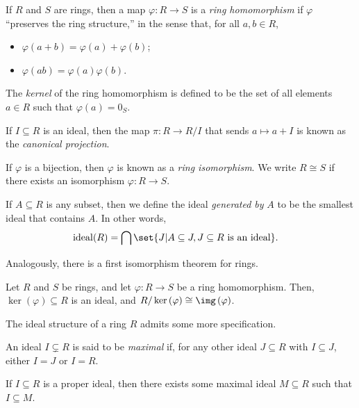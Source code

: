 \begin{definition}
  If $R$ and $S$ are rings, then a map $\varphi\colon R\rightarrow S$ is a \textit{ring homomorphism} if $\varphi$ ``preserves the ring structure,'' in the sense that, for all $a,b\in R$,
  \begin{itemize}
    \item $\varphi\left(a+b\right) = \varphi\left(a\right) + \varphi\left(b\right)$;
    \item $\varphi\left(ab\right) = \varphi\left(a\right)\varphi\left(b\right)$.
  \end{itemize}
  The \textit{kernel} of the ring homomorphism is defined to be the set of all elements $a\in R$ such that $\varphi\left(a\right) = 0_{S}$.\newline

  If $I \subseteq R$ is an ideal, then the map $\pi\colon R\rightarrow R/I$ that sends $a \mapsto a + I$ is known as the \textit{canonical projection}.\newline

  If $\varphi$ is a bijection, then $\varphi$ is known as a \textit{ring isomorphism}. We write $R\cong S$ if there exists an isomorphism $\varphi\colon R\rightarrow S$.

  If $A\subseteq R$ is any subset, then we define the ideal \textit{generated by} $A$ to be the smallest ideal that contains $A$. In other words,
  \begin{align*}
    \operatorname{ideal}(R) &= \bigcap\set{J | A\subseteq J,J\subseteq R\text{ is an ideal}}.
  \end{align*}
\end{definition}
Analogously, there is a first isomorphism theorem for rings.
\begin{theorem}
  Let $R$ and $S$ be rings, and let $\varphi\colon R\rightarrow S$ be a ring homomorphism. Then, $\ker\left(\varphi\right)\subseteq R$ is an ideal, and $R/\ker\left(\varphi\right)\cong \img\left(\varphi\right)$.
\end{theorem}
The ideal structure of a ring $R$ admits some more specification.
\begin{definition}
  An ideal $I\subsetneq R$ is said to be \textit{maximal} if, for any other ideal $J\subseteq R$ with $I\subseteq J$, either $I = J$ or $I = R$.
\end{definition}
\begin{theorem}
  If $I\subseteq R$ is a proper ideal, then there exists some maximal ideal $M\subseteq R$ such that $I\subseteq M$.
\end{theorem}
